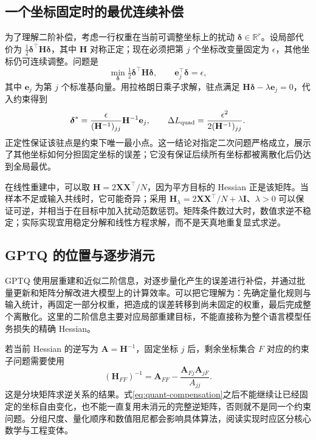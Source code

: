 \documentclass[UTF8,12pt,a4paper,fontset=fandol]{ctexart}
\begin{document}
\subsection{一个坐标固定时的最优连续补偿}
为了理解二阶补偿，考虑一行权重在当前可调整坐标上的扰动 $\boldsymbol\delta\in\mathbb R^r$。设局部代价为 $\tfrac12\boldsymbol\delta^\top\mathbf H\boldsymbol\delta$，其中 $\mathbf H$ 对称正定；现在必须把第 $j$ 个坐标改变量固定为 $\epsilon$，其他坐标仍可连续调整。问题是
\[
 \min_{\boldsymbol\delta}\tfrac12\boldsymbol\delta^\top\mathbf H\boldsymbol\delta,
 \qquad \mathbf e_j^\top\boldsymbol\delta=\epsilon,
\]
其中 $\mathbf e_j$ 为第 $j$ 个标准基向量。用拉格朗日乘子求解，驻点满足 $\mathbf H\boldsymbol\delta-\lambda\mathbf e_j=0$，代入约束得到
\begin{equation}
 \boldsymbol\delta^*=\frac{\epsilon}{(\mathbf H^{-1})_{jj}}\mathbf H^{-1}\mathbf e_j,
 \qquad
 \Delta L_{\rm quad}=\frac{\epsilon^2}{2(\mathbf H^{-1})_{jj}}.
 \label{eq:quant-compensation}
\end{equation}
正定性保证该驻点是约束下唯一最小点。这一结论对指定二次问题严格成立，展示了其他坐标如何分担固定坐标的误差；它没有保证后续所有坐标都被离散化后仍达到全局最优。

在线性重建中，可以取 $\mathbf H=2\mathbf X\mathbf X^\top/N$，因为平方目标的 Hessian 正是该矩阵。当样本不足或输入共线时，它可能奇异；采用 $\mathbf H_\lambda=2\mathbf X\mathbf X^\top/N+\lambda\mathbf I$、$\lambda>0$ 可以保证可逆，并相当于在目标中加入扰动范数惩罚。矩阵条件数过大时，数值求逆不稳定；实际实现宜用稳定分解和线性方程求解，而不是天真地重复显式求逆。

\subsection{GPTQ 的位置与逐步消元}
GPTQ 使用层重建和近似二阶信息，对逐步量化产生的误差进行补偿，并通过批量更新和矩阵分解改进大模型上的计算效率\cite{frantar2023}。可以把它理解为：先确定量化规则与输入统计，再固定一部分权重，把造成的误差转移到尚未固定的权重，最后完成整个离散化。这里的二阶信息主要对应局部重建目标，不能直接称为整个语言模型任务损失的精确 Hessian。

若当前 Hessian 的逆写为 $\mathbf A=\mathbf H^{-1}$，固定坐标 $j$ 后，剩余坐标集合 $F$ 对应的约束子问题需要使用
\begin{equation}
 (\mathbf H_{FF})^{-1}
 =\mathbf A_{FF}-\frac{\mathbf A_{Fj}\mathbf A_{jF}}{A_{jj}}.
 \label{eq:quant-inverse-update}
\end{equation}
这是分块矩阵求逆关系的结果。式\eqref{eq:quant-compensation}之后不能继续让已经固定的坐标自由变化，也不能一直复用未消元的完整逆矩阵，否则就不是同一个约束问题。分组尺度、量化顺序和数值阻尼都会影响具体算法，阅读实现时应区分核心数学与工程变体。
\end{document}
